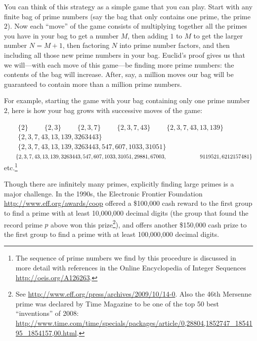 \documentclass[openany]{book}
\theoremstyle{plain}
\theoremstyle{definition}
\begin{document}
You can think of this strategy as a simple game that you can
play. Start with any finite bag of prime numbers (say the bag that
only contains one prime, the prime $2$). Now each ``move'' of the game
consists of multiplying together all the primes you have in your bag
to get a number $M$, then adding $1$ to $M$ to get the larger
number $N=M+1$, then factoring $N$ into prime number factors, and then
including all those new prime numbers in your bag. Euclid's proof
gives us that we will---with each move of this game---be finding more
prime numbers: the contents of the bag will increase. After, say,
a million moves our bag will be guaranteed to contain more than
a million prime numbers.

For example, starting the game with your bag containing
only one prime number $2$, here is how your bag grows with
successive moves of the game:

$\mbox{}\qquad\{2\}$
\newline
$\mbox{}\qquad\{2,3\}$
\newline
$\mbox{}\qquad\{2,3, 7\}$
\newline
$\mbox{}\qquad\{2,3, 7, 43\}$
\newline
$\mbox{}\qquad\{2,3, 7, 43, 13, 139\}$
\newline
$\mbox{}\qquad\{2,3, 7, 43, 13, 139, 3263443\}$
\newline
$\mbox{}\qquad\{2,3, 7, 43, 13, 139, 3263443,  547, 607, 1033, 31051\}$
\newline
$\mbox{}\qquad\{2,3, 7, 43, 13, 139, 3263443,  547, 607, 1033, 31051, 29881, 67003,\\
\mbox{}\qquad\qquad\qquad 9119521, 6212157481\}$
\newline
\mbox{}\qquad{}etc.\footnote{The sequence of prime numbers we find by this
procedure is discussed in more detail with references
in the Online Encyclopedia of Integer Sequences \url{http://oeis.org/A126263}.}

Though there are infinitely many primes, explicitly finding large primes is a
major challenge.  In the 1990s, the Electronic Frontier Foundation
\url{http://www.eff.org/awards/coop} offered a \$100{,}000 cash reward
to the first group to find a prime with at least 10{,}000{,}000 decimal
digits (the group that found the record prime $p$ above won this prize\footnote{%
See \url{http://www.eff.org/press/archives/2009/10/14-0}.
Also the 46th Mersenne prime was declared by Time Magazine to be
one of the top 50 best ``inventions'' of 2008: \url{http://www.time.com/time/specials/packages/article/0,28804,1852747_1854195_1854157,00.html}.}), and offers
another \$150{,}000 cash prize to the first group to find a prime with
at least 100{,}000{,}000 decimal digits.
\end{document}
